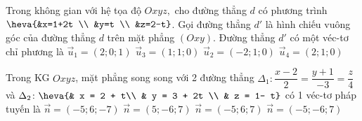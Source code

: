	\begin{ex}%
	Trong không gian với hệ tọa độ $Oxyz,$ cho đường thẳng $d$ có phương trình $\heva{&x=1+2t \\ &y=t \\ &z=2-t}$. Gọi đường thẳng $d'$ là hình chiếu vuông góc của đường thẳng $d$ trên mặt phẳng $(Oxy)$. Đường thẳng $d'$ có một véc-tơ chỉ phương là
	\choice
	{$\overrightarrow{u}_1=(2;0;1)$}
	{$\overrightarrow{u}_3=(1;1;0)$}
	{$\overrightarrow{u}_2=(-2;1;0)$}
	{\True $\overrightarrow{u}_4=(2;1;0)$}
	\end{ex}
	\begin{ex}%
	Trong KG $Oxyz$, mặt phẳng song song với 2 đường thẳng $\Delta_1 \colon \dfrac{x - 2}{2} = \dfrac{y + 1}{-3} = \dfrac{z}{4}$ và $\Delta_2 \colon \heva{& x = 2 + t\\ & y = 3 + 2t \\ & z = 1- t}$ có 1 véc-tơ pháp tuyến là 
	\choice
	{$\vec{n} = (-5; 6; -7)$}
	{$\vec{n} = (5; - 6 ; 7)$}
	{\True $\vec{n} = (-5; 6; 7)$}
	{$\vec{n} = (-5; -6; 7)$}
	\end{ex}
